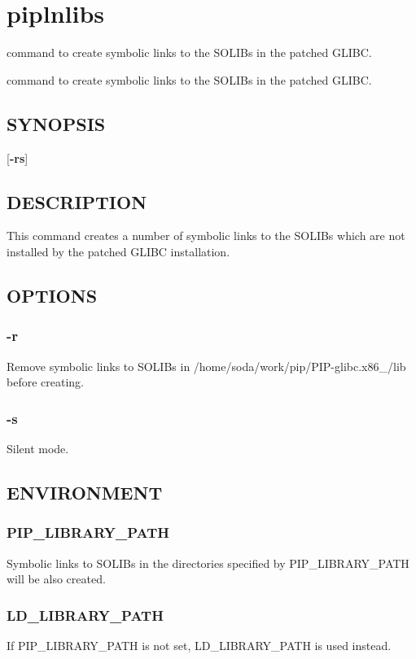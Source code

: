 \hypertarget{group__piplnlibs}{\section{piplnlibs}
\label{group__piplnlibs}
}


command to create symbolic links to the S\-O\-L\-I\-Bs in the patched G\-L\-I\-B\-C.  


command to create symbolic links to the S\-O\-L\-I\-Bs in the patched G\-L\-I\-B\-C. \hypertarget{group__piplnlibs_synopsis}{}\subsection{S\-Y\-N\-O\-P\-S\-I\-S}\label{group__piplnlibs_synopsis}
{ }\mbox{[}{\bfseries -\/rs}\mbox{]}\hypertarget{group__piplnlibs_description}{}\subsection{D\-E\-S\-C\-R\-I\-P\-T\-I\-O\-N}\label{group__piplnlibs_description}
This command creates a number of symbolic links to the S\-O\-L\-I\-Bs which are not installed by the patched G\-L\-I\-B\-C installation.\hypertarget{group__piplnlibs_options}{}\subsection{O\-P\-T\-I\-O\-N\-S}\label{group__piplnlibs_options}
\hypertarget{group__piplnlibs_remove}{}\subsubsection{-\/r}\label{group__piplnlibs_remove}
Remove symbolic links to S\-O\-L\-I\-Bs in /home/soda/work/pip/\-P\-I\-P-\/glibc.x86\-\_/lib before creating.\hypertarget{group__piplnlibs_silent}{}\subsubsection{-\/s}\label{group__piplnlibs_silent}
Silent mode.\hypertarget{group__piplnlibs_environment}{}\subsection{E\-N\-V\-I\-R\-O\-N\-M\-E\-N\-T}\label{group__piplnlibs_environment}
\hypertarget{group__piplnlibs_PIP_LIBRARY_PATH}{}\subsubsection{P\-I\-P\-\_\-\-L\-I\-B\-R\-A\-R\-Y\-\_\-\-P\-A\-T\-H}\label{group__piplnlibs_PIP_LIBRARY_PATH}
Symbolic links to S\-O\-L\-I\-Bs in the directories specified by P\-I\-P\-\_\-\-L\-I\-B\-R\-A\-R\-Y\-\_\-\-P\-A\-T\-H will be also created.\hypertarget{group__piplnlibs_LD_LIBRARY_PATH}{}\subsubsection{L\-D\-\_\-\-L\-I\-B\-R\-A\-R\-Y\-\_\-\-P\-A\-T\-H}\label{group__piplnlibs_LD_LIBRARY_PATH}
If P\-I\-P\-\_\-\-L\-I\-B\-R\-A\-R\-Y\-\_\-\-P\-A\-T\-H is not set, L\-D\-\_\-\-L\-I\-B\-R\-A\-R\-Y\-\_\-\-P\-A\-T\-H is used instead. 
